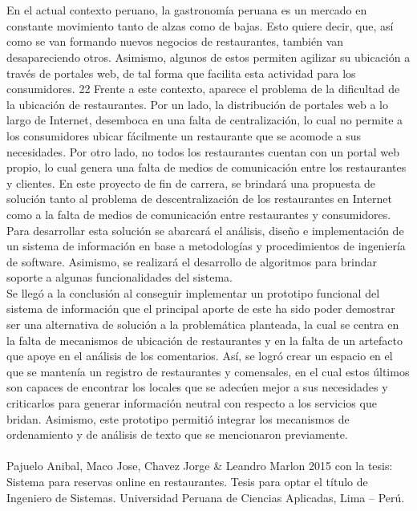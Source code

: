 \begin{large}
\\
\\
En el actual contexto peruano, la gastronomía peruana es un mercado en constante movimiento tanto de alzas como de bajas. Esto quiere decir, que, así como se van formando nuevos negocios de restaurantes, también van desapareciendo otros. Asimismo, algunos de estos permiten agilizar su ubicación a través de portales web, de tal forma que facilita esta actividad para los consumidores. 22 Frente a este contexto, aparece el problema de la dificultad de la ubicación de restaurantes. Por un lado, la distribución de portales web a lo largo de Internet, desemboca en una falta de centralización, lo cual no permite a los consumidores ubicar fácilmente un restaurante que se acomode a sus necesidades. Por otro lado, no todos los restaurantes cuentan con un portal web propio, lo cual genera una falta de medios de comunicación entre los restaurantes y clientes. En este proyecto de fin de carrera, se brindará una propuesta de solución tanto al problema de descentralización de los restaurantes en Internet como a la falta de medios de comunicación entre restaurantes y consumidores. Para desarrollar esta solución se abarcará el análisis, diseño e implementación de un sistema de información en base a metodologías y procedimientos de ingeniería de software. Asimismo, se realizará el desarrollo de algoritmos para brindar soporte a algunas funcionalidades del sistema. 
\\
Se llegó a la conclusión al conseguir implementar un prototipo funcional del sistema de información que el principal aporte de este ha sido poder demostrar ser una alternativa de solución a la problemática planteada, la cual se centra en la falta de mecanismos de ubicación de restaurantes y en la falta de un artefacto que apoye en el análisis de los comentarios. Así, se logró crear un espacio en el que se mantenía un registro de restaurantes y comensales, en el cual estos últimos son capaces de encontrar los locales que se adecúen mejor a sus necesidades y criticarlos para generar información neutral con respecto a los servicios que bridan. Asimismo, este prototipo permitió integrar los mecanismos de ordenamiento y de análisis de texto que se mencionaron previamente. 
\\
\\
Pajuelo Anibal, Maco Jose, Chavez Jorge & Leandro Marlon 2015 con la tesis: Sistema para reservas online en restaurantes. Tesis para optar el título de Ingeniero de Sistemas. Universidad Peruana de Ciencias Aplicadas, Lima – Perú. 
\\

\end{large}
